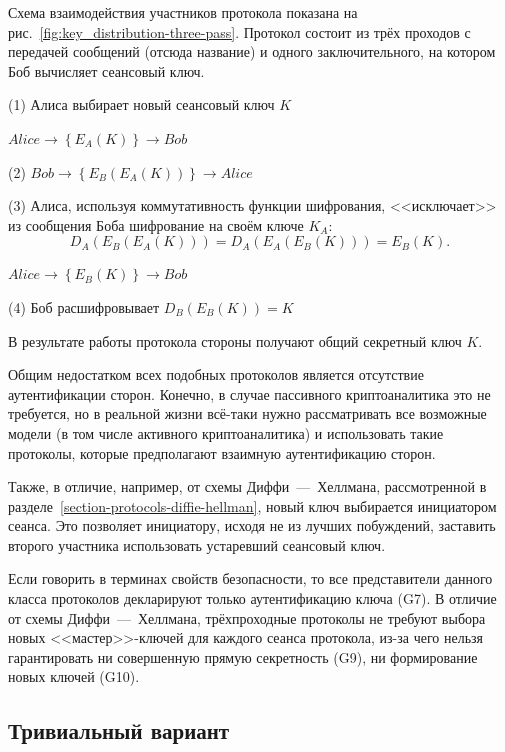 Схема взаимодействия участников протокола показана на рис.~\ref{fig:key_distribution-three-pass}. Протокол состоит из трёх проходов с передачей сообщений (отсюда название) и одного заключительного, на котором Боб вычисляет сеансовый ключ.

\begin{protocol}
    \item[(1)] Алиса выбирает новый сеансовый ключ $K$
    \item[{}] $Alice \to \left\{ E_A \left( K \right) \right\} \to Bob$
    \item[(2)] $Bob \to \left\{ E_B \left( E_A \left( K \right) \right) \right\} \to Alice$
    \item[(3)] Алиса, используя коммутативность функции шифрования, <<исключает>> из сообщения Боба шифрование на своём ключе $K_A$:
	\[ D_A \left( E_B \left( E_A \left( K \right) \right) \right) = D_A \left( E_A \left( E_B \left( K \right) \right) \right) = E_B \left( K \right). \]
    \item[{}] $Alice \to \left\{ E_B \left( K \right) \right\} \to Bob$
    \item[(4)] Боб расшифровывает $D_B \left( E_B \left( K \right) \right) = K$
\end{protocol}

В результате работы протокола стороны получают общий секретный ключ $K$.

Общим недостатком всех подобных протоколов является отсутствие аутентификации сторон. Конечно, в случае пассивного криптоаналитика это не требуется, но в реальной жизни всё-таки нужно рассматривать все возможные модели (в том числе активного криптоаналитика) и использовать такие протоколы, которые предполагают взаимную аутентификацию сторон.

Также, в отличие, например, от схемы Диффи~---~Хеллмана, рассмотренной в разделе~\ref{section-protocols-diffie-hellman}, новый ключ выбирается инициатором сеанса. Это позволяет инициатору, исходя не из лучших побуждений, заставить второго участника использовать устаревший сеансовый ключ.

Если говорить в терминах свойств безопасности, то все представители данного класса протоколов декларируют только аутентификацию ключа (G7). В отличие от схемы Диффи~---~Хеллмана, трёхпроходные протоколы не требуют выбора новых <<мастер>>-ключей для каждого сеанса протокола, из-за чего нельзя гарантировать ни совершенную прямую секретность (G9), ни формирование новых ключей (G10).

\subsection{Тривиальный вариант}

